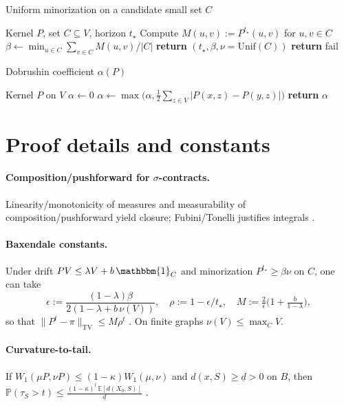 \documentclass[11pt]{article}
\newcommand{\E}{\mathbb{E}}
\newcommand{\Prob}{\mathbb{P}}
\newcommand{\TV}{\mathrm{TV}}
\newcommand{\Wone}{W_1}
\newcommand{\1}{\mathbbm{1}}
\begin{document}
\begin{algorithm}[h]
\caption{Uniform minorization on a candidate small set $C$}\label{alg:minor}
\begin{algorithmic}[1]
\Require Kernel $P$, set $C\subseteq V$, horizon $t_\star$
\State Compute $M(u,v):=P^{t_\star}(u,v)$ for $u,v\in C$
\State $\beta \gets \min_{u\in C}\sum_{v\in C} M(u,v)/|C|$
 \State \textbf{return} $(t_\star,\beta,\nu=\mathrm{Unif}(C))$ 
\Else \State \textbf{return} fail
\EndIf
\end{algorithmic}
\end{algorithm}

\begin{algorithm}[h]
\caption{Dobrushin coefficient $\alpha(P)$}\label{alg:dobrushin}
\begin{algorithmic}[1]
\Require Kernel $P$ on $V$
\State $\alpha\gets 0$
    \State $\alpha\gets \max\bigl(\alpha,\tfrac12\sum_{z\in V}|P(x,z)-P(y,z)|\bigr)$
  \EndFor
\EndFor
\State \textbf{return} $\alpha$
\end{algorithmic}
\end{algorithm}

\section{Proof details and constants}\label{sec:proofs}
\paragraph{Composition/pushforward for $\sigma$-contracts.}
Linearity/monotonicity of measures and measurability of composition/pushforward yield closure; Fubini/Tonelli justifies integrals \parencite{Bogachev2007}.

\paragraph{Baxendale constants.}
Under drift $PV\le \lambda V + b\,\1_C$ and minorization $P^{t_\star}\ge \beta \nu$ on $C$, one can take
\[
\epsilon:=\frac{(1-\lambda)\beta}{2(1-\lambda+b\,\nu(V))},\quad
\rho:=1-\epsilon/t_\star,\quad
M:=\tfrac{2}{\epsilon}\bigl(1+\tfrac{b}{1-\lambda}\bigr),
\]
so that $\|P^t-\pi\|_{\TV}\le M\rho^t$ \parencite{Baxendale2005}. On finite graphs $\nu(V)\le \max_C V$.

\paragraph{Curvature-to-tail.}
If $\Wone(\mu P,\nu P)\le (1-\kappa)\Wone(\mu,\nu)$ and $d(x,S)\ge \underline{d}>0$ on $B$, then
\(
\Prob(\tau_S>t)\le \tfrac{(1-\kappa)^t\,\E[d(X_0,S)]}{\underline{d}}
\) \parencite{Ollivier2009,JoulinOllivier2010}.
\end{document}

